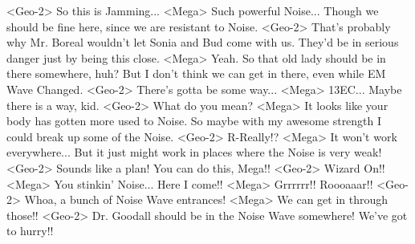 <Geo-2> So this is Jamming... 
<Mega> Such powerful Noise... 
Though we should be fine here, since we are resistant to Noise. 
<Geo-2> That's probably why Mr. Boreal wouldn't let Sonia and Bud come with us. 
They'd be in serious danger just by being this close. 
<Mega> Yeah. So that old lady should be in there somewhere, huh? 
But I don't think we can get in there, even while EM Wave Changed. 
<Geo-2> There's gotta be some way... 
<Mega> {13}{EC}... 
Maybe there is a way, kid. 
<Geo-2> What do you mean? 
<Mega> It looks like your body has gotten more used to Noise. 
So maybe with my awesome strength I could break up some of the Noise. 
<Geo-2> R-Really!? 
<Mega> It won't work everywhere... 
But it just might work in places where the Noise is very weak! 
<Geo-2> Sounds like a plan! You can do this, Mega!! 
<Geo-2> Wizard On!! 
<Mega> You stinkin' Noise... 
Here I come!! 
<Mega> Grrrrrr!! Roooaaar!! 
<Geo-2> Whoa, a bunch of Noise Wave entrances! 
<Mega> We can get in through those!! 
<Geo-2> Dr. Goodall should be in the Noise Wave somewhere! 
We've got to hurry!! 

